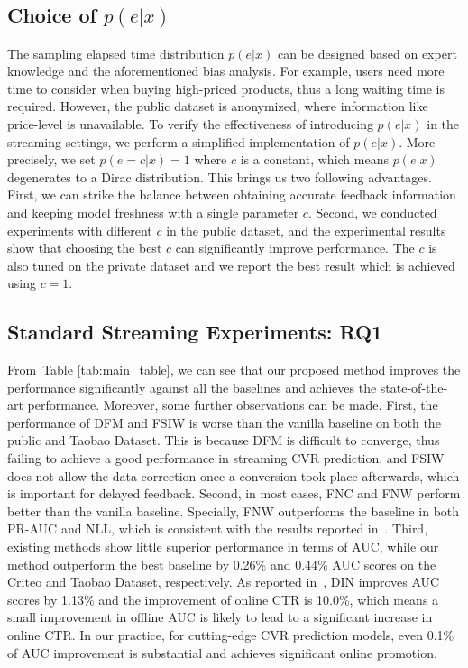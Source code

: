 \documentclass[letterpaper]{article}
\newcommand{\mtabref}[1]{Table \ref{#1}}
\newcommand{\mdata}{Taobao Dataset}
\begin{document}
\subsection{Choice of $p(e|x)$}
The sampling elapsed time distribution $p(e|x)$ can be designed based on expert knowledge and the aforementioned bias analysis. For example, users need more time to consider when buying high-priced products, thus a long waiting time is required. However, the public dataset is anonymized, where information like price-level is unavailable. To verify the effectiveness of introducing $p(e|x)$ in the streaming settings, we perform a simplified implementation of $p(e|x)$. More precisely, we set $p(e=c|x)=1$ where $c$ is a constant, which means $p(e|x)$ degenerates to a Dirac distribution. This brings us two following advantages. First, we can strike the balance between obtaining accurate feedback information and keeping model freshness with a single parameter $c$. Second, we conducted experiments with different $c$ in the public dataset, and the experimental results show that choosing the best $c$ can significantly improve performance. The $c$ is also tuned on the private dataset and we report the best result which is achieved using $c=1$.

\subsection{Standard Streaming Experiments: RQ1}

From~\mtabref{tab:main_table}, we can see that our proposed method improves the performance significantly against all the baselines and achieves the state-of-the-art performance. Moreover, some further observations can be made. First, the performance of DFM and FSIW is worse than the vanilla baseline on both the public and \mdata{}. This is because DFM is difficult to converge, thus failing to achieve a good performance in streaming CVR prediction, and FSIW does not allow the data correction once a conversion took place afterwards, which is important for delayed feedback. Second, in most cases, FNC and FNW perform better than the vanilla baseline. Specially, FNW outperforms the baseline in both PR-AUC and NLL, which is consistent with the results reported in~\citet{FNW}. Third, existing methods show little superior performance in terms of AUC, while our method outperform the best baseline by 0.26\% and 0.44\% AUC scores on the Criteo and \mdata{}, respectively. As reported in~\citet{zhou2018deep}, DIN improves AUC scores by 1.13\% and the improvement of online CTR is 10.0\%, which means a small improvement in offline AUC is likely to lead to a significant increase in online CTR. In our practice, for cutting-edge CVR prediction models, even 0.1\% of AUC improvement is substantial and achieves significant online promotion.
\end{document}
